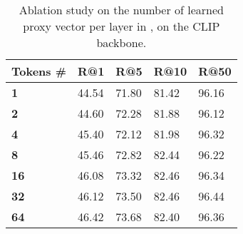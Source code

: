 \begin{table}[ht]
\centering
\caption{Ablation study on the number of learned proxy vector per layer in \oursp, on the CLIP backbone.}
\label{tab:ablations_proxy_vecs}
\begin{tabular}{@{}lllll@{}}
\toprule
 Tokens \# & R@1 & R@5 & R@10 & R@50 \\ \midrule
{\bf 1} & 44.54 & 71.80 & 81.42 & 96.16 \\
{\bf 2} & 44.60 & 72.28 & 81.88 & 96.12 \\
{\bf 4} & 45.40 & 72.12 & 81.98 & 96.32 \\
{\bf 8} & 45.46 & 72.82 & 82.44 & 96.22 \\
{\bf 16} & 46.08 & 73.32 & 82.46 & 96.34 \\
{\bf 32} & 46.12 & 73.50 & 82.46 & 96.44 \\
{\bf 64} & 46.42 & 73.68 & 82.40 & 96.36 \\
 \bottomrule
\end{tabular}
\end{table}

